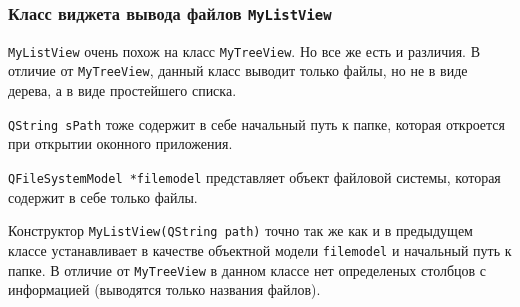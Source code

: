 \subsubsection{Класс виджета вывода файлов \texttt{MyListView}}

\texttt{MyListView} очень похож на класс \texttt{MyTreeView}.
Но все же есть и различия.
В отличие от \texttt{MyTreeView}, данный класс выводит только файлы, но не в виде дерева, а в виде простейшего списка.



\texttt{QString sPath} тоже содержит в себе начальный путь к папке, которая откроется при открытии оконного приложения.



\texttt{QFileSystemModel *filemodel} представляет объект файловой системы, которая содержит в себе только файлы.



Конструктор \texttt{MyListView(QString path)} точно так же как и в предыдущем классе устанавливает в качестве объектной модели \texttt{filemodel} и начальный путь к папке.
В отличие от \texttt{MyTreeView} в данном классе нет определеных столбцов с информацией (выводятся только названия файлов).

